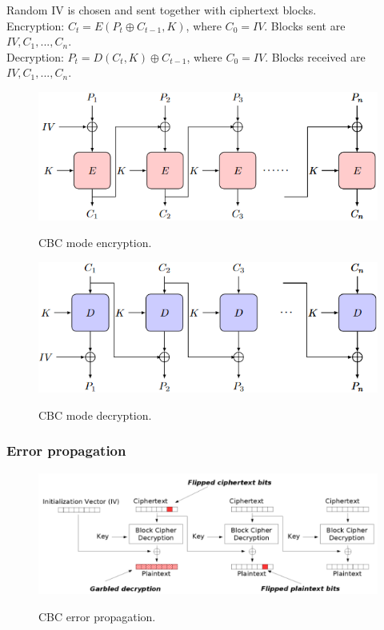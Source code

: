 \documentclass{article}
\begin{document}
Random IV is chosen and sent together with ciphertext blocks.\\
Encryption: $C_t = E(P_t \oplus C_{t-1}, K)$, where $C_0 = IV$. Blocks sent are $IV, C_1, ..., C_n$.\\
Decryption: $P_t = D(C_t, K) \oplus C_{t-1}$, where $C_0 = IV$. Blocks received are $IV, C_1, ..., C_n$.\\
\begin{figure}[H]
\centering
\includegraphics[scale=0.75]{Images/cbcencryption.png}
\label{fig:fround}
\caption{CBC mode encryption.}
\end{figure}
\begin{figure}[H]
\centering
\includegraphics[scale=0.75]{Images/cbcdecryption.png}
\label{fig:fround}
\caption{CBC mode decryption.}
\end{figure}

\subsubsection{Error propagation}

\begin{figure}[H]
\centering
\includegraphics[scale=0.75]{Images/cbcerrorpropagation.png}
\label{fig:fround}
\caption{CBC error propagation.}
\end{figure}
\end{document}
